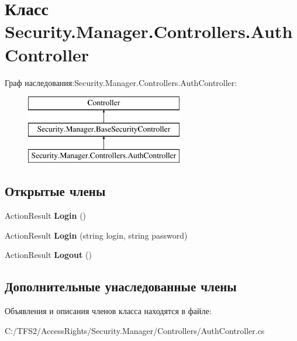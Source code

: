 \hypertarget{class_security_1_1_manager_1_1_controllers_1_1_auth_controller}{}\section{Класс Security.\+Manager.\+Controllers.\+Auth\+Controller}
\label{class_security_1_1_manager_1_1_controllers_1_1_auth_controller}
Граф наследования\+:Security.\+Manager.\+Controllers.\+Auth\+Controller\+:\begin{figure}[H]
\begin{center}
\leavevmode
\includegraphics[height=3.000000cm]{d9/dde/class_security_1_1_manager_1_1_controllers_1_1_auth_controller}
\end{center}
\end{figure}
\subsection*{Открытые члены}
\begin{DoxyCompactItemize}
\item 
\mbox{\label{class_security_1_1_manager_1_1_controllers_1_1_auth_controller_ac4214076047459796ee4b6fde2f7d68c}} 
Action\+Result {\bfseries Login} ()
\item 
\mbox{\label{class_security_1_1_manager_1_1_controllers_1_1_auth_controller_a78d00d5094e0420a493d5d6f39afd9cd}} 
Action\+Result {\bfseries Login} (string login, string password)
\item 
\mbox{\label{class_security_1_1_manager_1_1_controllers_1_1_auth_controller_a54996673b1efe38dd418822931bac840}} 
Action\+Result {\bfseries Logout} ()
\end{DoxyCompactItemize}
\subsection*{Дополнительные унаследованные члены}


Объявления и описания членов класса находятся в файле\+:\begin{DoxyCompactItemize}
\item 
C\+:/\+T\+F\+S2/\+Access\+Rights/\+Security.\+Manager/\+Controllers/Auth\+Controller.\+cs\end{DoxyCompactItemize}

